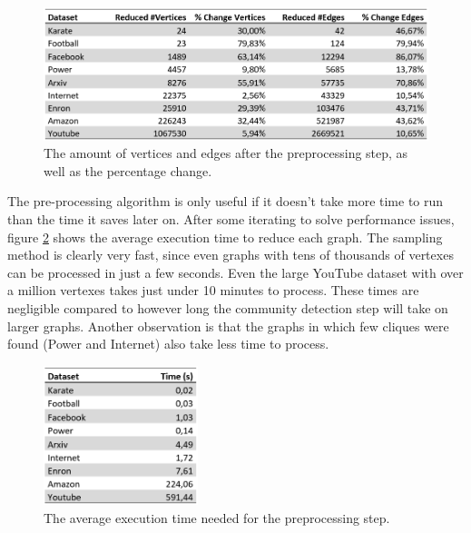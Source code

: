 \begin{figure}[H]
\begin{center}
\includegraphics[width=1\textwidth]{images/reducedtable.png}
\caption{The amount of vertices and edges after the preprocessing step, as well as the percentage change.}\label{fig:reducedtable}
\end{center}
\end{figure}

The pre-processing algorithm is only useful if it doesn't take more time to run than the time it saves later on. After some iterating to solve performance issues, figure \ref{fig:prespeed} shows the average execution time to reduce each graph. The sampling method is clearly very fast, since even graphs with tens of thousands of vertexes can be processed in just a few seconds. Even the large YouTube dataset with over a million vertexes takes just under 10 minutes to process. These times are negligible compared to however long the community detection step will take on larger graphs. Another observation is that the graphs in which few cliques were found (Power and Internet) also take less time to process.

\begin{figure}[H]
\begin{center}
\includegraphics[width=0.4\textwidth]{images/prespeed.png}
\caption{The average execution time needed for the preprocessing step.}\label{fig:prespeed}
\end{center}
\end{figure}

